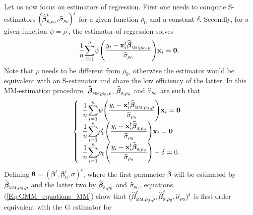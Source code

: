 Let us now focus on  estimators of regression. First one needs to compute
S-estimators $\left(  \sthat{\boldsymbol\beta}_{\stsc{S};\rho_{0}}%
^{t},\sthat{\sigma}_{\rho_{0}}\right)  ^{t}$ for a given function $\rho_{0}$
and a constant $\delta$. Secondly, for a given function $\psi=\rho^{\prime}$,
the  estimator of regression solves
\[
\dfrac{1}{n}%
{\displaystyle\sum\limits_{i=1}^{n}}
\psi\left(  \dfrac{y_{i}-\stvec{x}_{i}^{t}\sthat{\boldsymbol\beta%
}_{\stsc{MM};\rho_{0},\rho}}{\sthat{\sigma}_{\rho_{0}}}\right)
\stvec{x}_{i}=\stvec{0}.
\]
Note that $\rho$ needs to be different from $\rho_{0}$, otherwise the
 estimator would be equivalent with an S-estimator and share the low
efficiency of the latter. In this MM-estimation procedure, $\widehat
{\boldsymbol\beta}_{\stsc{MM};\rho_{0},\rho}$, $\sthat{\boldsymbol{\beta
}}_{\stsc{S};\rho_{0}}$ and $\widehat{\sigma}_{\rho_{0}}$ are such that
\begin{equation}
\left\{
\begin{array}
[c]{l}%
\dfrac{1}{n}%
{\displaystyle\sum\limits_{i=1}^{n}}
\psi\left(  \dfrac{y_{i}-\stvec{x}_{i}^{t}\sthat{\boldsymbol\beta%
}_{\stsc{MM};\rho_{0},\rho}}{\sthat{\sigma}_{\rho_{0}}}\right)
\stvec{x}_{i}=\stvec{0}\\
\dfrac{1}{n}%
{\displaystyle\sum\limits_{i=1}^{n}}
\rho_{0}^{\prime}\left(  \dfrac{y_{i}-\stvec{x}_{i}^{t}\widehat
{\boldsymbol\beta}_{\stsc{S};\rho_{0}}}{\sthat{\sigma}_{\rho_{0}}%
}\right)  \stvec{x}_{i}=\stvec{0}\\
\dfrac{1}{n}%
{\displaystyle\sum\limits_{i=1}^{n}}
\rho_{0}\left(  \dfrac{y_{i}-\stvec{x}_{i}^{t}\sthat{\boldsymbol\beta%
}_{\stsc{S};\rho_{0}}}{\sthat{\sigma}_{\rho_{0}}}\right)  -\delta=0.
\end{array}
\right.  \label{Eq:GMM_equations_MM}%
\end{equation}
Defining $\boldsymbol{\theta}=(\boldsymbol\beta^{t},\boldsymbol\beta%
_{0}^{t},\sigma)^{t}$, where the first parameter $\boldsymbol\beta$ will be
estimated by $\sthat{\boldsymbol\beta}_{\stsc{MM};\rho_{0},\rho}$ and
the latter two by $\sthat{\boldsymbol\beta}_{\stsc{S};\rho_{0}}$ and
$\widehat{\sigma}_{\rho_{0}}$, equations (\ref{Eq:GMM_equations_MM}) show that
$(\sthat{\boldsymbol\beta}_{\stsc{MM};\rho_{0},\rho}^{t},\widehat
{\boldsymbol\beta}_{\stsc{S};\rho_{0}}^{t},\sthat{\sigma}_{\rho_{0}%
})^{t}$ is first-order equivalent with the G estimator for
